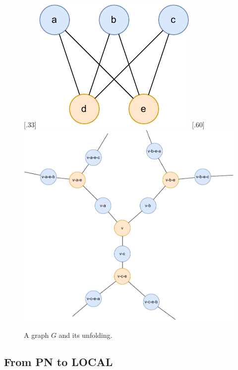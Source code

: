 \begin{figure}[H]
      [.33\linewidth] {
      \centering
      \includegraphics[scale=0.55]{diagrams/universal_cover_1.pdf}
    }%
    \hfill
      [.60\linewidth] {
      \centering
      \includegraphics[scale=0.50]{diagrams/universal_cover_2.pdf}
    }
    \caption{A graph $G$ and its unfolding.
    }
    \label{fig:algorithm:universal_cover}
\end{figure}


\newpage
\subsection{From PN to LOCAL} \label{sec:algorithm:from_pn_to_local}

